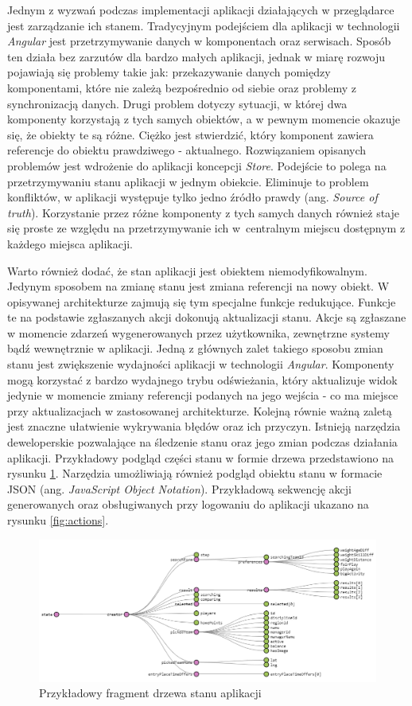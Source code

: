 Jednym z wyzwań podczas implementacji aplikacji działających w przeglądarce jest zarządzanie ich stanem. Tradycyjnym podejściem dla aplikacji w technologii \textit{Angular} jest przetrzymywanie danych w komponentach oraz serwisach. Sposób ten działa bez zarzutów dla bardzo małych aplikacji, jednak w miarę rozwoju pojawiają się problemy takie jak: przekazywanie danych pomiędzy komponentami, które nie zależą bezpośrednio od siebie oraz problemy z synchronizacją danych. Drugi problem dotyczy sytuacji, w której dwa komponenty korzystają z tych samych obiektów, a w pewnym momencie okazuje się, że obiekty te są różne. Ciężko jest stwierdzić, który komponent zawiera referencje do obiektu prawdziwego - aktualnego. Rozwiązaniem opisanych problemów jest wdrożenie do aplikacji koncepcji \textit{Store}. Podejście to polega na przetrzymywaniu stanu aplikacji w jednym obiekcie. Eliminuje to problem konfliktów, w aplikacji występuje tylko jedno źródło prawdy (ang. \textit{Source of truth}). Korzystanie przez różne komponenty z tych samych danych również staje się proste ze względu na przetrzymywanie ich w~centralnym miejscu dostępnym z każdego miejsca aplikacji.

Warto również dodać, że stan aplikacji jest obiektem niemodyfikowalnym. Jedynym sposobem na zmianę stanu jest zmiana referencji na nowy obiekt. W opisywanej architekturze zajmują się tym specjalne funkcje redukujące. Funkcje te na podstawie zgłaszanych akcji dokonują aktualizacji stanu. Akcje są zgłaszane w momencie zdarzeń wygenerowanych przez użytkownika, zewnętrzne systemy bądź wewnętrznie w aplikacji. Jedną z głównych zalet takiego sposobu zmian stanu jest zwiększenie wydajności aplikacji w technologii \textit{Angular}. Komponenty mogą korzystać z bardzo wydajnego trybu odświeżania, który aktualizuje widok jedynie w momencie zmiany referencji podanych na jego wejścia - co ma miejsce przy aktualizacjach w zastosowanej architekturze. Kolejną równie ważną zaletą jest znaczne ułatwienie wykrywania błędów oraz ich przyczyn. Istnieją narzędzia deweloperskie pozwalające na śledzenie stanu  oraz jego zmian podczas działania aplikacji. Przykładowy podgląd części stanu w formie drzewa przedstawiono na rysunku \ref{fig:state}. Narzędzia umożliwiają również podgląd obiektu stanu w formacie JSON (ang. \textit{JavaScript Object Notation}). Przykładową sekwencję akcji generowanych oraz obsługiwanych przy logowaniu do aplikacji ukazano na rysunku \ref{fig:actions}.

\begin{figure}[H]
\centering
\includegraphics[width=\linewidth]{06-implementacja/rys/state-after.PNG}
\caption{Przykładowy fragment drzewa stanu aplikacji}
\label{fig:state}
\end{figure}



